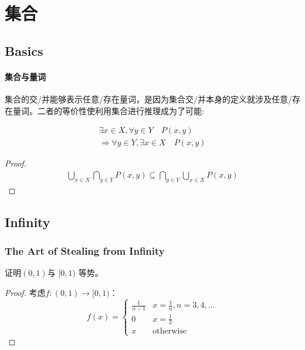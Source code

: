 \chapter{集合}
\section{Basics}
\subsubsection{集合与量词}

集合的交/并能够表示任意/存在量词，是因为集合交/并本身的定义就涉及任意/存在量词。二者的等价性使利用集合进行推理成为了可能:

\begin{theorem}
    \begin{align*}
        \exists x \in X, \forall y \in Y \quad P(x,y) \\
        \Rightarrow \forall y \in Y, \exists x \in X \quad P(x,y)
    \end{align*}
\end{theorem}

\begin{proof}
    \begin{align*}
        \bigcup_{x \in X} \bigcap_{y \in Y} P(x,y) \subseteq
        \bigcap_{y \in Y} \bigcup_{x \in X} P(x,y)
    \end{align*}
\end{proof}

\section{Infinity}
\subsection{The Art of Stealing from Infinity}

\begin{problem}
    证明\((0,1)\)与 \([0,1)\) 等势。
\end{problem}

\begin{proof}
    考虑\(f:(0,1) \to [0,1)\)：\[
        f(x) =
        \begin{cases}
            \frac{1}{n-1} & x =\frac{1}{n}, n=3,4,\dots  \\
            0 & x=\frac{1}{2} \\
            x & \text{otherwise}
        \end{cases}
    \]
\end{proof}

